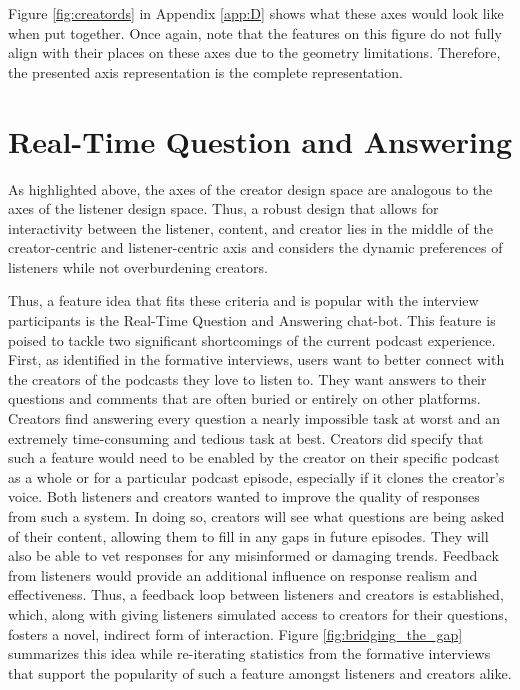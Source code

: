 \documentclass[12pt]{report}
\begin{document}
\begin{myfont}
        \indent Figure \ref{fig:creatords} in Appendix \ref{app:D} shows what these axes would look like when put together. Once again, note that the features on this figure do not fully align with their places on these axes due to the geometry limitations. Therefore, the presented axis representation is the complete representation. 
        
        \section{Real-Time Question and Answering}
        \indent As highlighted above, the axes of the creator design space are analogous to the axes of the listener design space. Thus, a robust design that allows for interactivity between the listener, content, and creator lies in the middle of the creator-centric and listener-centric axis and considers the dynamic preferences of listeners while not overburdening creators.
        
        \indent Thus, a feature idea that fits these criteria and is popular with the interview participants is the Real-Time Question and Answering chat-bot. This feature is poised to tackle two significant shortcomings of the current podcast experience. First, as identified in the formative interviews, users want to better connect with the creators of the podcasts they love to listen to. They want answers to their questions and comments that are often buried or entirely on other platforms. Creators find answering every question a nearly impossible task at worst and an extremely time-consuming and tedious task at best. Creators did specify that such a feature would need to be enabled by the creator on their specific podcast as a whole or for a particular podcast episode, especially if it clones the creator's voice. Both listeners and creators wanted to improve the quality of responses from such a system. In doing so, creators will see what questions are being asked of their content, allowing them to fill in any gaps in future episodes. They will also be able to vet responses for any misinformed or damaging trends. Feedback from listeners would provide an additional influence on response realism and effectiveness. Thus, a feedback loop between listeners and creators is established, which, along with giving listeners simulated access to creators for their questions, fosters a novel, indirect form of interaction. Figure \ref{fig:bridging_the_gap} summarizes this idea while re-iterating statistics from the formative interviews that support the popularity of such a feature amongst listeners and creators alike.


\end{myfont}
\end{document}
